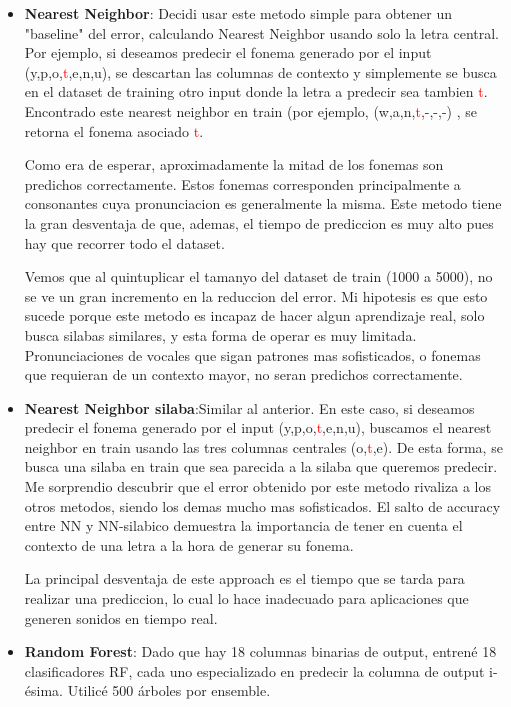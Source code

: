 \documentclass[paper=a4, fontsize=11pt]{scrartcl} %
\numberwithin{equation}{section} %
\numberwithin{figure}{section} %
\numberwithin{table}{section} %
\begin{document}
\begin{itemize}
\item \textbf{Nearest Neighbor}: Decidi usar este metodo simple para obtener un "baseline" del error, calculando Nearest Neighbor usando solo la letra central. Por ejemplo, si deseamos predecir el fonema generado por el input (y,p,o,\textcolor{red}{t},e,n,u), se descartan las columnas de contexto y simplemente se busca en el dataset de training otro input donde la letra a predecir sea tambien \textcolor{red}{t}. Encontrado este nearest neighbor en train (por ejemplo, (w,a,n,\textcolor{red}{t},-,-,-) , se retorna el fonema asociado \textcolor{red}{t}.

Como era de esperar, aproximadamente la mitad de los fonemas son predichos correctamente. Estos fonemas corresponden principalmente a consonantes cuya pronunciacion es generalmente la misma. Este metodo tiene la gran desventaja de que, ademas, el tiempo de prediccion es muy alto pues hay que recorrer todo el dataset.

Vemos que al quintuplicar el tamanyo del dataset de train (1000 a 5000), no se ve un gran incremento en la reduccion del error. Mi hipotesis es que esto sucede porque este metodo es incapaz de hacer algun aprendizaje real, solo busca silabas similares, y esta forma de operar es muy limitada. Pronunciaciones de vocales que sigan patrones mas sofisticados, o fonemas que requieran de un contexto mayor, no seran predichos correctamente.

\item \textbf{Nearest Neighbor silaba}:Similar al anterior. En este caso, si deseamos predecir el fonema generado por el input (y,p,o,\textcolor{red}{t},e,n,u), buscamos el nearest neighbor en train usando las tres columnas centrales (o,\textcolor{red}{t},e). De esta forma, se busca una silaba en train que sea parecida a la silaba que queremos predecir. Me sorprendio descubrir que el error obtenido por este metodo rivaliza a los otros metodos, siendo los demas mucho mas sofisticados. El salto de accuracy entre NN y NN-silabico demuestra la importancia de tener en cuenta el contexto de una letra a la hora de generar su fonema.

La principal desventaja de este approach es el tiempo que se tarda para realizar una prediccion, lo cual lo hace inadecuado para aplicaciones que generen sonidos en tiempo real.


\item \textbf{Random Forest}: Dado que hay 18 columnas binarias de output, entrené 18 clasificadores RF, cada uno especializado en predecir la columna de output i-ésima. Utilicé 500 árboles por ensemble.


\end{itemize}
\end{document}
